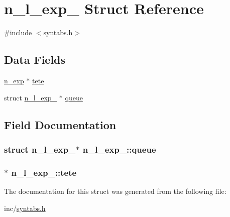\hypertarget{structn__l__exp__}{}\section{n\+\_\+l\+\_\+exp\+\_\+ Struct Reference}
\label{structn__l__exp__}


{\ttfamily \#include $<$syntabs.\+h$>$}

\subsection*{Data Fields}
\begin{DoxyCompactItemize}
\item 
\hyperlink{syntabs_8h_a9648f2af191445619fc50968978276c1}{n\+\_\+exp} $\ast$ \hyperlink{structn__l__exp___a9556f0b4becd1f9be2d779eea2d806f3}{tete}
\item 
struct \hyperlink{structn__l__exp__}{n\+\_\+l\+\_\+exp\+\_\+} $\ast$ \hyperlink{structn__l__exp___a4e263a2688ecd592699e99024f8961f9}{queue}
\end{DoxyCompactItemize}


\subsection{Field Documentation}
\subsubsection[{\texorpdfstring{queue}{queue}}]{\setlength{\rightskip}{0pt plus 5cm}struct {\bf n\+\_\+l\+\_\+exp\+\_\+}$\ast$ n\+\_\+l\+\_\+exp\+\_\+\+::queue}\hypertarget{structn__l__exp___a4e263a2688ecd592699e99024f8961f9}{}\label{structn__l__exp___a4e263a2688ecd592699e99024f8961f9}
\subsubsection[{\texorpdfstring{tete}{tete}}]{$\ast$ n\+\_\+l\+\_\+exp\+\_\+\+::tete}\hypertarget{structn__l__exp___a9556f0b4becd1f9be2d779eea2d806f3}{}\label{structn__l__exp___a9556f0b4becd1f9be2d779eea2d806f3}


The documentation for this struct was generated from the following file\+:\begin{DoxyCompactItemize}
\item 
inc/\hyperlink{syntabs_8h}{syntabs.\+h}\end{DoxyCompactItemize}

